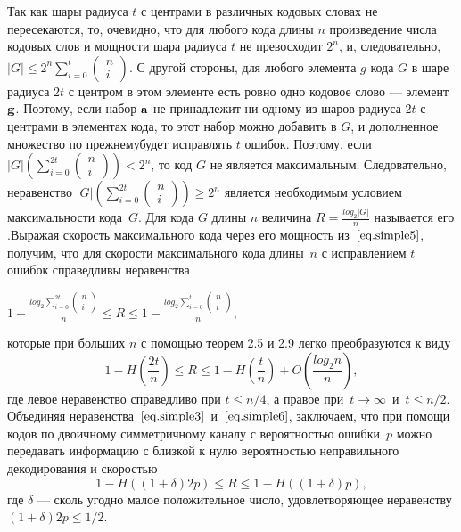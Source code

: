 \documentclass[12pt]{article}
\numberwithin{equation}{section}
\begin{document}
Так как шары радиуса $t$ с центрами в различных кодовых словах не пересекаются, то, очевидно, что для любого кода длины $n$ произведение
числа кодовых слов и мощности шара радиуса $t$ не превосходит $2^n$, и, следовательно, $|G|\le 2^{n}{\sum_{i=0}^t \begin{pmatrix} n \\ i  \end{pmatrix}}$. С другой стороны, для любого элемента $g$ кода $G$ в шаре радиуса $2t$ с центром в этом элементе есть ровно одно кодовое слово — элемент $\bf g$. Поэтому, если набор $\bf{a}$ не принадлежит ни одному из шаров радиуса $2t$ с центрами в элементах кода, то этот набор можно добавить в $G$, и дополненное множество по прежнемубудет исправлять $t$
ошибок. Поэтому, если $|G|({\sum_{i=0}^{2t} \begin{pmatrix} n \\ i  \end{pmatrix}}) < 2^n$, то код $G$ не является максимальным. Следовательно, неравенство $|G|({\sum_{i=0}^{2t} \begin{pmatrix} n \\ i  \end{pmatrix}})\ge 2^n$ является необходимым условием максимальности кода~$G$.
Для кода $G$ длины $n$ величина $R=\frac{log_2 |G|}{n}$ называется его {}.Выражая скорость максимального кода через его мощность из~$\eqref{eq.simple5}$, получим, что для скорости максимального кода длины~$n$ с исправлением $t$ ошибок справедливы неравенства

$1-\frac{log_2{\sum_{i=0}^{2t} \begin{pmatrix} n \\ i  \end{pmatrix}}}{n} \le R \le 1-\frac{log_2{\sum_{i=0}^{t} \begin{pmatrix} n \\ i  \end{pmatrix}}}{n}$,

которые при больших $n$ с помощью теорем 2.5 и 2.9 легко преобразуются к
виду
\begin{equation}
1-H\genfrac{(}{)}{}{}{2t}{n} \le R \le 1-H\genfrac{(}{)}{}{}{t}{n}+O\genfrac{(}{)}{}{}{log_2n}{n},
\label{eq.simple6} 
\end{equation}
где левое неравенство справедливо при $t\le n/4$, а правое при~$t\rightarrow \infty$~и~$t\le n/2$. Объединяя неравенства~$\eqref{eq.simple3}$~и~$\eqref{eq.simple6}$, заключаем, что при помощи кодов по двоичному симметричному каналу с вероятностью ошибки~$p$ можно передавать информацию с близкой к нулю вероятностью неправильного декодирования и скоростью
\begin{equation}
1-H((1+\delta)2p) \le R \le 1-H((1+\delta)p),
\label{eq.simple7} 
\end{equation}
где $\delta$ — сколь угодно малое положительное число, удовлетворяющее неравенству $(1 + \delta)2p \le 1/2$.
\end{document}
